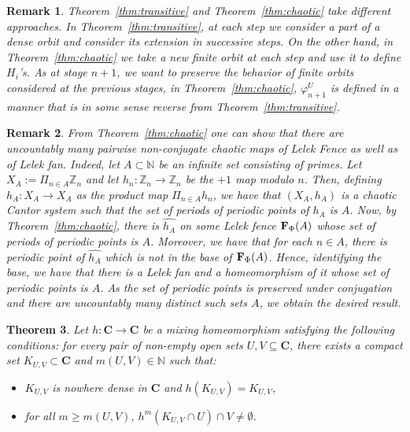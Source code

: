 \documentclass[11pt]{amsart}
\newtheorem{theorem}{Theorem}[section]
\newtheorem{remark}[theorem]{Remark}
\newcommand{\N}{\mathbb{N}}  %
\newcommand{\Z}{\mathbb{Z}}  %
\newcommand{\cantor}{\mathbf C}
\newcommand{\fence}{{\bf F}_{\Phi}{}}
\begin{document}
{\begin{remark}
Theorem~\ref{thm:transitive} and Theorem~\ref{thm:chaotic} take different approaches. In Theorem~\ref{thm:transitive}, at each step we consider a part of a dense orbit and consider its extension in successive steps. On the other hand, in Theorem~\ref{thm:chaotic} we take a new finite orbit at each step and use it to define $H_i$'s. As at stage $n+1$, we want to preserve the behavior of finite orbits considered at the previous stages, in Theorem~\ref{thm:chaotic}, $\varphi^U_{n+1}$ is  defined in a manner that is in some sense reverse  from Theorem~\ref{thm:transitive}.
\end{remark}
\begin{remark}
From Theorem~\ref{thm:chaotic} one can show that there are uncountably many pairwise non-conjugate chaotic maps of Lelek Fence as well as of Lelek fan. Indeed, let $A \subset \N$ be an infinite set consisting of primes. Let $X_A := \Pi _{n \in A} \Z_n$ and let $h_n:\Z_n \rightarrow \Z_n$ be the $+1$ map modulo $n$. Then, defining $h_A: X_A \rightarrow X_A$ as the product map $\Pi_{n \in A} h_n$, we have that $(X_A,h_A)$ is a chaotic Cantor system such that the set of periods of periodic points of $h_A$ is $A$. Now, by Theorem~\ref{thm:chaotic}, there is $\widehat{h_A}$ on some Lelek fence $\fence(A)$ whose set of periods of periodic points is $A$. Moreover, we have that for each $n \in A$, there is periodic point of $\widehat{h_A}$ which is not in the base of $\fence(A)$. Hence, identifying the base, we have that there is a Lelek fan and a homeomorphism of it whose set of periodic points is $A$. As the set of periodic points is preserved under conjugation and there are uncountably many distinct such sets $A$, we obtain the desired result. 
\end{remark}

\begin{theorem}\label{thm:mixing}
Let $h:\cantor \rightarrow \cantor$ be a mixing homeomorphism satisfying the following conditions:
for every pair of non-empty open sets \( U, V \subseteq \cantor \), there exists a  compact set \( K_{U,V}\subset \cantor  \) and $m(U,V) \in \N$ such that:
\begin{itemize}
\item $K_{U,V}$ is nowhere dense in $\cantor$ and $h(K_{U,V} )=K_{U,V}$,
    \item for all \( m \geq m(U,V) \), \( h^m(K_{U,V} \cap U) \cap V \neq \emptyset \).
\end{itemize}


\end{theorem}}
\end{document}
